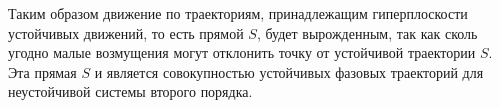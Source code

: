 Таким образом движение по траекториям, принадлежащим гиперплоскости устойчивых движений, то есть прямой $S$, будет вырожденным, так как сколь угодно малые возмущения могут отклонить точку от устойчивой траектории $S$. Эта прямая $S$ и является совокупностью устойчивых фазовых траекторий для неустойчивой системы второго порядка. 
